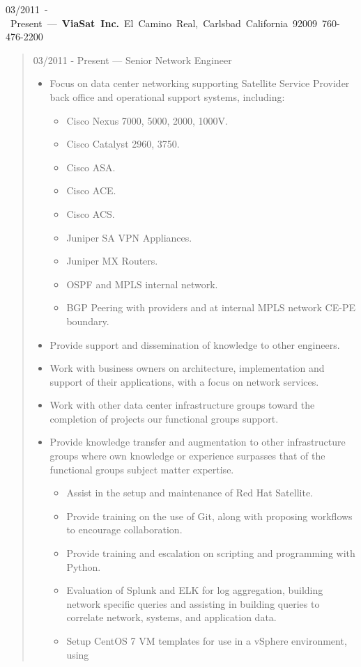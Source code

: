 \mbox{03/2011 - Present --- {\bf ViaSat Inc.} El Camino Real, Carlsbad California 92009 760-476-2200}
\begin{quote}
03/2011 - Present --- Senior Network Engineer\\
\begin{itemize}
\item Focus on data center networking supporting Satellite Service Provider
back office and operational support systems, including:
\begin{itemize}
\item Cisco Nexus 7000, 5000, 2000, 1000V.
\item Cisco Catalyst 2960, 3750.
\item Cisco ASA.
\item Cisco ACE.
\item Cisco ACS.
\item Juniper SA VPN Appliances.
\item Juniper MX Routers.
\item OSPF and MPLS internal network.
\item BGP Peering with providers and at internal MPLS network CE-PE boundary.
\end{itemize}
\item Provide support and dissemination of knowledge to other engineers.
\item Work with business owners on architecture, implementation and support of
their applications, with a focus on network services.
\item Work with other data center infrastructure groups toward the completion of
projects our functional groups support.
\item Provide knowledge transfer and augmentation to other infrastructure groups
where own knowledge or experience surpasses that of the functional groups
subject matter expertise.
\begin{itemize}
\item Assist in the setup and maintenance of Red Hat Satellite.
\item Provide training on the use of Git, along with proposing workflows to
encourage collaboration.
\item Provide training and escalation on scripting and programming with Python.
\item Evaluation of Splunk and ELK for log aggregation, building network
specific queries and assisting in building queries to correlate network,
systems, and application data.
\item Setup CentOS 7 VM templates for use in a vSphere environment, using

\end{itemize}
\end{itemize}
\end{quote}
